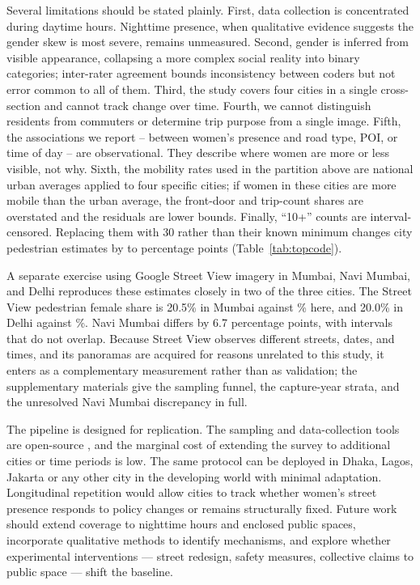 \documentclass[12pt]{article}
\begin{document}
Several limitations should be stated plainly. First, data collection is concentrated during daytime hours. Nighttime presence, when qualitative evidence suggests the gender skew is most severe, remains unmeasured. Second, gender is inferred from visible appearance, collapsing a more complex social reality into binary categories; inter-rater agreement bounds inconsistency between coders but not error common to all of them. Third, the study covers four cities in a single cross-section and cannot track change over time. Fourth, we cannot distinguish residents from commuters or determine trip purpose from a single image. Fifth, the associations we report -- between women's presence and road type, POI, or time of day -- are observational. They describe where women are more or less visible, not why. Sixth, the mobility rates used in the partition above are national urban averages applied to four specific cities; if women in these cities are more mobile than the urban average, the front-door and trip-count shares are overstated and the residuals are lower bounds. Finally, ``10+'' counts are interval-censored. Replacing them with 30 rather than their known minimum changes city pedestrian estimates by \MinTopcodeShiftPP{} to \MaxTopcodeShiftPP{} percentage points (Table~\ref{tab:topcode}).

A separate exercise using Google Street View imagery in Mumbai, Navi Mumbai, and Delhi reproduces these estimates closely in two of the three cities. The Street View pedestrian female share is 20.5\% in Mumbai against \MumbaiPedestrianShare\% here, and 20.0\% in Delhi against \DelhiPedestrianShare\%. Navi Mumbai differs by 6.7 percentage points, with intervals that do not overlap. Because Street View observes different streets, dates, and times, and its panoramas are acquired for reasons unrelated to this study, it enters as a complementary measurement rather than as validation; the supplementary materials give the sampling funnel, the capture-year strata, and the unresolved Navi Mumbai discrepancy in full.

The pipeline is designed for replication. The sampling and data-collection tools are open-source \citep{geo_sampling, allocator}, and the marginal cost of extending the survey to additional cities or time periods is low. The same protocol can be deployed in Dhaka, Lagos,  Jakarta or any other city in the developing world with minimal adaptation. Longitudinal repetition would allow cities to track whether women's street presence responds to policy changes or remains structurally fixed. Future work should extend coverage to nighttime hours and enclosed public spaces, incorporate qualitative methods to identify mechanisms, and explore whether experimental interventions --- street redesign, safety measures, collective claims to public space --- shift the baseline.
\end{document}
